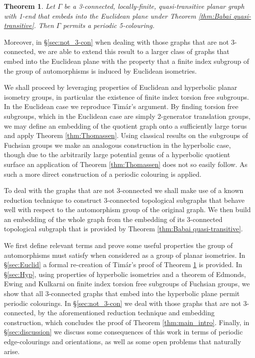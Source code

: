 \documentclass{article}
\numberwithin{equation}{section}
\newtheorem{theorem}[lemma]{Theorem}
\theoremstyle{definition}
\theoremstyle{remark}
\begin{document}
\begin{theorem}\label{thm:Euc_5_col}
    Let $\Gamma$ be a 3-connected, locally-finite, quasi-transitive planar graph with 1-end that embeds into the Euclidean plane under Theorem \ref{thm:Babai quasi-transitive}. Then $\Gamma$ permits a periodic 5-colouring.
\end{theorem}
Moreover, in \S\ref{sec:not_3-con} when dealing with those graphs that are not 3-connected, we are able to extend this result to a larger class of graphs that embed into the Euclidean plane with the property that a finite index subgroup of the group of automorphisms is induced by Euclidean isometries.

We shall proceed by leveraging properties of Euclidean and hyperbolic planar isometry groups, in particular the existence of finite index torsion free subgroups. In the Euclidean case we reproduce Timár's argument. By finding torsion free subgroups, which in the Euclidean case are simply 2-generator translation groups, we may define an embedding of the quotient graph onto a sufficiently large torus and apply Theorem \ref{thm:Thomassen}. 
Using classical results on the subgroups of Fuchsian groups we make an analogous construction in the hyperbolic case, though due to the arbitrarily large potential genus of a hyperbolic quotient surface an application of Theorem \ref{thm:Thomassen} does not so easily follow. As such a more direct construction of a periodic colouring is applied. 

To deal with the graphs that are not 3-connected we shall make use of a known reduction technique 
to construct 3-connected topological subgraphs that behave well with respect to the automorphism group of the original graph.
We then build an embedding of the whole graph from the embedding of its 3-connected topological subgraph that is provided by Theorem \ref{thm:Babai quasi-transitive}. 

We first define relevant terms and prove some useful properties the group of automorphisms must satisfy when considered as a group of planar isometries. In \S\ref{sec:Euclid} a formal re-creation of Timár's proof of Theorem \ref{thm:Euc_5_col} is provided. In \S\ref{sec:Hyp}, using properties of hyperbolic isometries and a theorem of Edmonds, Ewing and Kulkarni \cite{Edmonds1982} on finite index torsion free subgroups of Fuchsian groups, we show that all 3-connected graphs that embed into the hyperbolic plane permit periodic colourings. In \S \ref{sec:not_3-con} we deal with those graphs that are not 3-connected, by the aforementioned reduction technique and embedding construction, which concludes the proof of Theorem \ref{thm:main_intro}. 
Finally, in \S\ref{sec:discussion} we discuss some consequences of this work in terms of periodic edge-colourings and orientations, as well as some open problems that naturally arise.
\end{document}
